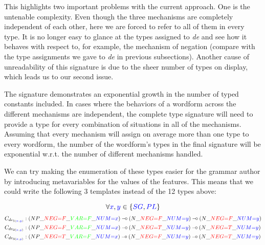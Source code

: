 This highlights two important problems with the current approach. One is
the untenable complexity. Even though the three mechanisms are
completely independent of each other, here we are forced to refer to all
of them in every type. It is no longer easy to glance at the types
assigned to \emph{de} and see how it behaves with respect to, for
example, the mechanism of negation (compare with the type assignments we
gave to \emph{de} in previous subsections). Another cause of
unreadability of this signature is due to the sheer number of types on
display, which leads us to our second issue.

The signature demonstrates an exponential growth in the number of typed
constants included. In cases where the behaviors of a wordform across
the different mechanisms are independent, the complete type signature
will need to provide a type for every combination of situations in all
of the mechanisms. Assuming that every mechanism will assign on average
more than one type to every wordform, the number of the wordform's types
in the final signature will be exponential w.r.t. the number of
different mechanisms handled.

We can try making the enumeration of these types easier for the grammar
author by introducing metavariables for the values of the features. This
means that we could write the following 3 templates instead of the 12
types above:

$$
\forall \textcolor{blue}{x}, \textcolor{blue}{y} \in \{\textcolor{blue}{SG}, \textcolor{blue}{PL}\}
$$
\vspace{-1cm}
{\small
\begin{align*}
C_{de_{1(\textcolor{blue}{x}, \textcolor{blue}{y})}} &: (NP\_\textcolor{red}{NEG{=}F}\_\textcolor{green}{VAR{=}F}\_\textcolor{blue}{NUM{=}x}) \mathbin{{-}\mkern-3.5mu{\circ}} (N\_\textcolor{red}{NEG{=}F}\_\textcolor{blue}{NUM{=}y}) \mathbin{{-}\mkern-3.5mu{\circ}} (N\_\textcolor{red}{NEG{=}F}\_\textcolor{blue}{NUM{=}y}) \\
C_{de_{2(\textcolor{blue}{x}, \textcolor{blue}{y})}} &: (NP\_\textcolor{red}{NEG{=}F}\_\textcolor{green}{VAR{=}F}\_\textcolor{blue}{NUM{=}x}) \mathbin{{-}\mkern-3.5mu{\circ}} (N\_\textcolor{red}{NEG{=}T}\_\textcolor{blue}{NUM{=}y}) \mathbin{{-}\mkern-3.5mu{\circ}} (N\_\textcolor{red}{NEG{=}T}\_\textcolor{blue}{NUM{=}y}) \\
C_{de_{3(\textcolor{blue}{x}, \textcolor{blue}{y})}} &: (NP\_\textcolor{red}{NEG{=}T}\_\textcolor{green}{VAR{=}F}\_\textcolor{blue}{NUM{=}x}) \mathbin{{-}\mkern-3.5mu{\circ}} (N\_\textcolor{red}{NEG{=}F}\_\textcolor{blue}{NUM{=}y}) \mathbin{{-}\mkern-3.5mu{\circ}} (N\_\textcolor{red}{NEG{=}T}\_\textcolor{blue}{NUM{=}y})
\end{align*}
}

